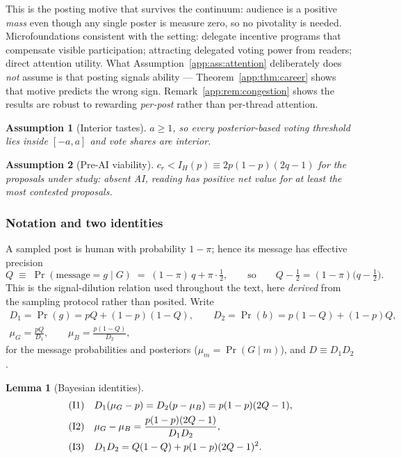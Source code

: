 \documentclass[12pt]{article}
\newtheorem{lemma}{Lemma}
\newtheorem{assumption}{Assumption}
\newcommand{\Pro}{\Pr}
\begin{document}
This is the posting motive that survives the continuum: audience is a positive
\emph{mass} even though any single poster is measure zero, so no pivotality is
needed. Microfoundations consistent with the setting: delegate incentive
programs that compensate visible participation; attracting delegated voting
power from readers; direct attention utility. What Assumption~\ref{app:ass:attention}
deliberately does \emph{not} assume is that posting signals ability ---
Theorem~\ref{app:thm:career} shows that motive predicts the wrong sign.
Remark~\ref{app:rem:congestion} shows the results are robust to rewarding
\emph{per-post} rather than per-thread attention.

\begin{assumption}[Interior tastes]\label{app:ass:interior}
$a\ge 1$, so every posterior-based voting threshold lies inside $[-a,a]$ and
vote shares are interior.
\end{assumption}

\begin{assumption}[Pre-AI viability]\label{app:ass:viable}
$c_r< I_H(p)\equiv 2p(1-p)(2q-1)$ for the proposals under study: absent AI,
reading has positive net value for at least the most contested proposals.
\end{assumption}

\subsubsection{Notation and two identities}

A sampled post is human with probability $1-\pi$; hence its message has
effective precision
\begin{equation}\label{app:eq:Qeff}
Q \;\equiv\; \Pro(\text{message}=g\mid G)\;=\;(1-\pi)\,q+\pi\cdot\tfrac12,
\qquad\text{so}\qquad Q-\tfrac12=(1-\pi)\bigl(q-\tfrac12\bigr).
\end{equation}
This is the signal-dilution relation used throughout the text, here \emph{derived}
from the sampling protocol rather than posited. Write
\begin{gather*}
D_1=\Pro(g)=pQ+(1-p)(1-Q),\qquad D_2=\Pro(b)=p(1-Q)+(1-p)Q,\\
\mu_G=\tfrac{pQ}{D_1},\qquad \mu_B=\tfrac{p(1-Q)}{D_2},
\end{gather*}
for the message probabilities and posteriors ($\mu_m=\Pro(G\mid m)$), and
$D\equiv D_1D_2$.

\begin{lemma}[Bayesian identities]\label{app:lem:identities}
\begin{align}
\textup{(I1)}\quad & D_1(\mu_G-p)=D_2(p-\mu_B)=p(1-p)(2Q-1),\\
\textup{(I2)}\quad & \mu_G-\mu_B=\frac{p(1-p)(2Q-1)}{D_1D_2},\\
\textup{(I3)}\quad & D_1D_2=Q(1-Q)+p(1-p)(2Q-1)^2.
\end{align}
\end{lemma}
\end{document}
